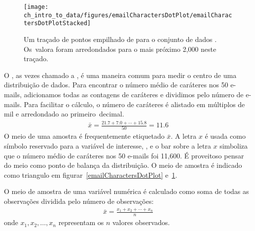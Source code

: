 \begin{figure}[h]
   \centering
   \texttt{[image: ch\_intro\_to\_data/figures/emailCharactersDotPlot/emailCharactersDotPlotStacked]}
   \caption{
    Um traçado de pontos empilhado de  para o conjunto de dados .
    Os~valora foram arredondados para o mais próximo 2,000 neste traçado.
   }
   \label{emailCharactersDotPlotStacked}
\end{figure}

O , as vezes chamado a , é uma maneira comum para medir o centro de uma distribuição de dados.
Para encontrar o número médio de caráteres nos 50 e-mails, adicionamos todas as contagens de caráteres e dividimos pelo número de e-mails.
Para facilitar o cálculo, o número de caráteres é alistado em múltiplos de mil e arredondado ao primeiro~decimal.
\begin{eqnarray}
\bar{x} = \frac{21.7 + 7.0 + \cdots + 15.8}{50} = 11.6
\label{sampleMeanEquation}
\end{eqnarray}
O meio de uma amostra é frequentemente etiquetado $\bar{x}$.
A letra $x$ é usada como símbolo reservado para a variável de interesse, , e o bar sobre a letra $x$ simboliza que o número médio de caráteres nos 50 e-mails foi 11,600.
É proveitoso pensar do meio como ponto de balança da distribuição.
O meio de amostra é indicado como triangulo em figurar~\ref{emailCharactersDotPlot} e~\ref{emailCharactersDotPlotStacked}.

\begin{termBox}{%
  O meio de amostra de uma variável numérica é calculado como soma de todas as observações dividida pelo número de observações:
\begin{eqnarray}
\bar{x} = \frac{x_1+x_2+\cdots+x_n}{n}
\label{meanEquation}
\end{eqnarray}
onde $x_1, x_2, \dots, x_n$ representam os $n$ valores observados.}
\end{termBox}\vspace{-2mm}

